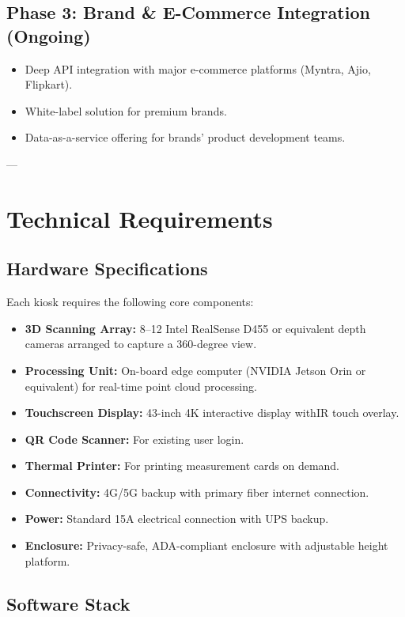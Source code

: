 \documentclass[12pt,a4paper]{article}
\begin{document}
\subsection{Phase 3: Brand \& E-Commerce Integration (Ongoing)}

\begin{itemize}
    \item Deep API integration with major e-commerce platforms (Myntra, Ajio, Flipkart).
    \item White-label solution for premium brands.
    \item Data-as-a-service offering for brands' product development teams.
\end{itemize}

---

\section{Technical Requirements}

\subsection{Hardware Specifications}

Each kiosk requires the following core components:

\begin{itemize}
    \item \textbf{3D Scanning Array:} 8--12 Intel RealSense D455 or equivalent depth cameras arranged to capture a 360-degree view.
    \item \textbf{Processing Unit:} On-board edge computer (NVIDIA Jetson Orin or equivalent) for real-time point cloud processing.
    \item \textbf{Touchscreen Display:} 43-inch 4K interactive display withIR touch overlay.
    \item \textbf{QR Code Scanner:} For existing user login.
    \item \textbf{Thermal Printer:} For printing measurement cards on demand.
    \item \textbf{Connectivity:} 4G/5G backup with primary fiber internet connection.
    \item \textbf{Power:} Standard 15A electrical connection with UPS backup.
    \item \textbf{Enclosure:} Privacy-safe, ADA-compliant enclosure with adjustable height platform.
\end{itemize}

\subsection{Software Stack}
\end{document}
